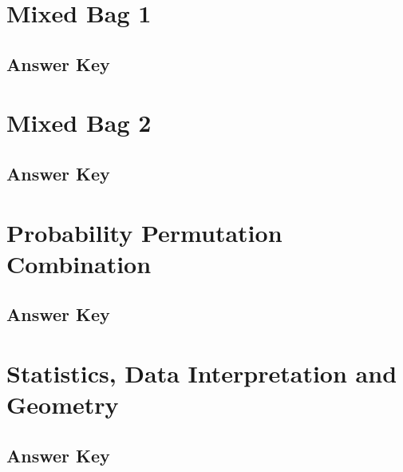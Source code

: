 \documentclass[12pt,a4paper]{book}
\newcounter{totalcounter}
\begin{document}


\setcounter{totalcounter}{1}

\section{Mixed Bag 1}



\subsection*{Answer Key}



\setcounter{totalcounter}{1}

\section{Mixed Bag 2}



\subsection*{Answer Key}



\setcounter{totalcounter}{1}

\section{Probability Permutation Combination}



\subsection*{Answer Key}



\setcounter{totalcounter}{1}

\section{Statistics, Data Interpretation and Geometry}



\subsection*{Answer Key}


\end{document}
